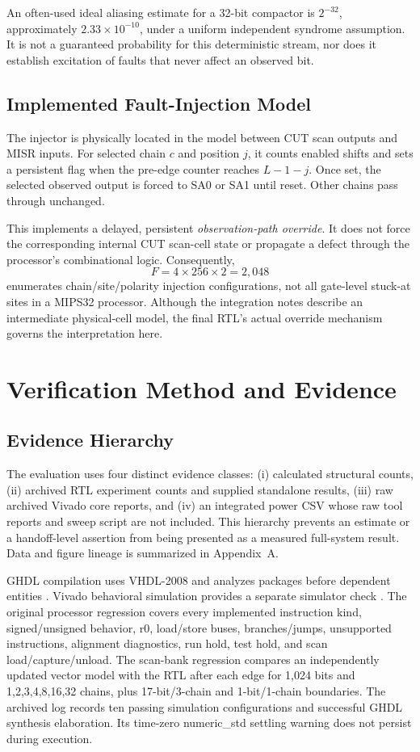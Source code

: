 \documentclass[conference,a4paper]{IEEEtran}
\begin{document}
An often-used ideal aliasing estimate for a 32-bit compactor is $2^{-32}$,
approximately $2.33\times10^{-10}$, under a uniform independent syndrome
assumption. It is not a guaranteed probability for this deterministic stream,
nor does it establish excitation of faults that never affect an observed bit.

\subsection{Implemented Fault-Injection Model}
The injector is physically located in the model between CUT scan outputs and
MISR inputs. For selected chain $c$ and position $j$, it counts enabled shifts
and sets a persistent flag when the pre-edge counter reaches $L-1-j$. Once
set, the selected observed output is forced to SA0 or SA1 until reset. Other
chains pass through unchanged.

This implements a delayed, persistent \emph{observation-path override}. It
does not force the corresponding internal CUT scan-cell state or propagate
a defect through the processor's combinational logic. Consequently,
\begin{equation}
 F=4\times256\times2=2,048
\end{equation}
enumerates chain/site/polarity injection configurations, not all gate-level
stuck-at sites in a MIPS32 processor. Although the integration notes describe
an intermediate physical-cell model, the final RTL's actual override mechanism
governs the interpretation here.

\section{Verification Method and Evidence}
\subsection{Evidence Hierarchy}
The evaluation uses four distinct evidence classes: (i) calculated structural
counts, (ii) archived RTL experiment counts and supplied standalone results,
(iii) raw archived Vivado core reports, and (iv) an integrated power CSV whose
raw tool reports and sweep script are not included. This hierarchy prevents
an estimate or a handoff-level assertion from being presented as a measured
full-system result. Data and figure lineage is summarized in Appendix~A.

GHDL compilation uses VHDL-2008 and analyzes packages before dependent
entities \cite{ghdl}. Vivado behavioral simulation provides a separate
simulator check \cite{ug900}. The original processor regression covers every
implemented instruction kind, signed/unsigned behavior, r0, load/store buses,
branches/jumps, unsupported instructions, alignment diagnostics, run hold,
test hold, and scan load/capture/unload. The scan-bank regression compares an
independently updated vector model with the RTL after each edge for 1,024 bits
and 1,2,3,4,8,16,32 chains, plus 17-bit/3-chain and 1-bit/1-chain boundaries.
The archived log records ten passing simulation configurations and successful
GHDL synthesis elaboration. Its time-zero numeric\_std settling warning does
not persist during execution.
\end{document}
